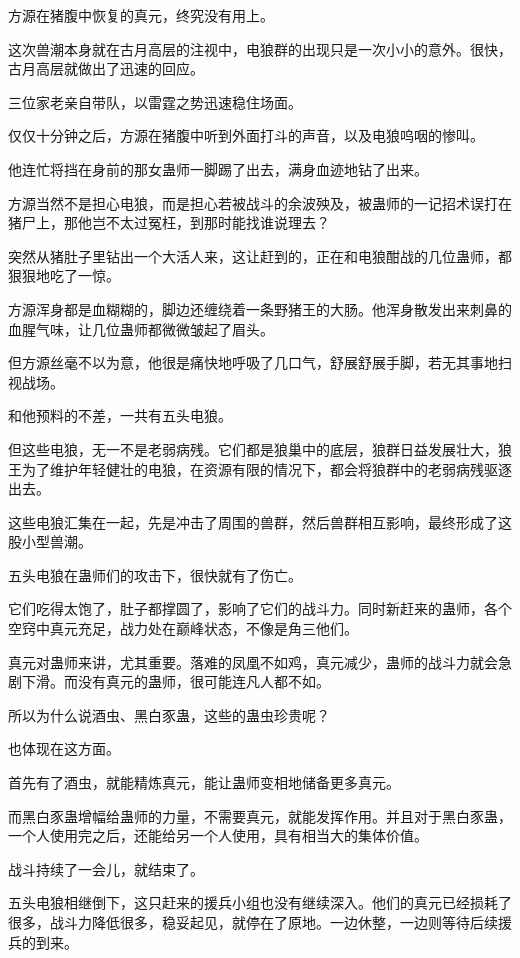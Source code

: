 
\begin{this_body}

方源在猪腹中恢复的真元，终究没有用上。

这次兽潮本身就在古月高层的注视中，电狼群的出现只是一次小小的意外。很快，古月高层就做出了迅速的回应。

三位家老亲自带队，以雷霆之势迅速稳住场面。

仅仅十分钟之后，方源在猪腹中听到外面打斗的声音，以及电狼呜咽的惨叫。

他连忙将挡在身前的那女蛊师一脚踢了出去，满身血迹地钻了出来。

方源当然不是担心电狼，而是担心若被战斗的余波殃及，被蛊师的一记招术误打在猪尸上，那他岂不太过冤枉，到那时能找谁说理去？

突然从猪肚子里钻出一个大活人来，这让赶到的，正在和电狼酣战的几位蛊师，都狠狠地吃了一惊。

方源浑身都是血糊糊的，脚边还缠绕着一条野猪王的大肠。他浑身散发出来刺鼻的血腥气味，让几位蛊师都微微皱起了眉头。

但方源丝毫不以为意，他很是痛快地呼吸了几口气，舒展舒展手脚，若无其事地扫视战场。

和他预料的不差，一共有五头电狼。

但这些电狼，无一不是老弱病残。它们都是狼巢中的底层，狼群日益发展壮大，狼王为了维护年轻健壮的电狼，在资源有限的情况下，都会将狼群中的老弱病残驱逐出去。

这些电狼汇集在一起，先是冲击了周围的兽群，然后兽群相互影响，最终形成了这股小型兽潮。

五头电狼在蛊师们的攻击下，很快就有了伤亡。

它们吃得太饱了，肚子都撑圆了，影响了它们的战斗力。同时新赶来的蛊师，各个空窍中真元充足，战力处在巅峰状态，不像是角三他们。

真元对蛊师来讲，尤其重要。落难的凤凰不如鸡，真元减少，蛊师的战斗力就会急剧下滑。而没有真元的蛊师，很可能连凡人都不如。

所以为什么说酒虫、黑白豕蛊，这些的蛊虫珍贵呢？

也体现在这方面。

首先有了酒虫，就能精炼真元，能让蛊师变相地储备更多真元。

而黑白豕蛊增幅给蛊师的力量，不需要真元，就能发挥作用。并且对于黑白豕蛊，一个人使用完之后，还能给另一个人使用，具有相当大的集体价值。

战斗持续了一会儿，就结束了。

五头电狼相继倒下，这只赶来的援兵小组也没有继续深入。他们的真元已经损耗了很多，战斗力降低很多，稳妥起见，就停在了原地。一边休整，一边则等待后续援兵的到来。


\end{this_body}
